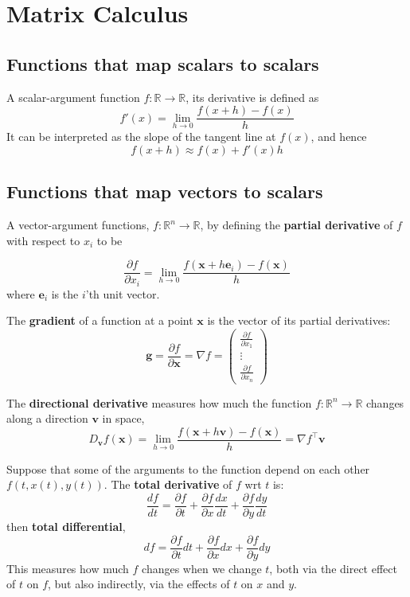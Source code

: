 \documentclass[11pt]{article}
\begin{document}
\clearpage
\section{Matrix Calculus}
\subsection{Functions that map scalars to scalars}

A scalar-argument function $f : \mathbb{R} \to \mathbb{R}$, its derivative is defined as
\[
f'(x) = \lim_{h \to 0} \frac{f(x + h) - f(x)}{h}
\]
It can be interpreted as the slope of the tangent line at $f(x)$, and hence
\[
f(x + h) \approx f(x) + f'(x)h
\]

\subsection{Functions that map vectors to scalars}
A vector-argument functions, $f : \mathbb{R}^n \to \mathbb{R}$, by defining
the \textbf{partial derivative} of $f$ with respect to $x_i$ to be

\[
\frac{\partial f}{\partial x_i} = \lim_{h \to 0} \frac{f(\boldsymbol{x} + h\boldsymbol{e}_i) - f(\boldsymbol{x})}{h}
\]
where $\boldsymbol{e}_i$ is the $i$'th unit vector.

The \textbf{gradient} of a function at a point $\boldsymbol{x}$ is the vector of its partial derivatives:
\[
\boldsymbol{g} = \frac{\partial f}{\partial \boldsymbol{x}} = \nabla f = \begin{pmatrix} \frac{\partial f}{\partial x_1} \\ \vdots \\ \frac{\partial f}{\partial x_n} \end{pmatrix}
\]

The \textbf{directional derivative} measures how much the function $f : \mathbb{R}^n \to \mathbb{R}$ changes along a direction $\boldsymbol{v}$ in space,
\[
D_{\boldsymbol{v}} f(\boldsymbol{x}) = \lim_{h \to 0} \frac{f(\boldsymbol{x} + h\boldsymbol{v}) - f(\boldsymbol{x})}{h} = \nabla f^\top \boldsymbol{v}
\]

Suppose that some of the arguments to the function depend on each other $f(t, x(t), y(t))$. The \textbf{total derivative} of $f$ wrt $t$ is:
\[
\frac{df}{dt} = \frac{\partial f}{\partial t} + \frac{\partial f}{\partial x} \frac{dx}{dt} + \frac{\partial f}{\partial y} \frac{dy}{dt}
\]
then \textbf{total differential},
\[
df = \frac{\partial f}{\partial t} dt + \frac{\partial f}{\partial x} dx + \frac{\partial f}{\partial y} dy
\]
This measures how much $f$ changes when we change $t$, both via the direct effect of $t$ on $f$, but also indirectly, via the effects of $t$ on $x$ and $y$.
\end{document}
